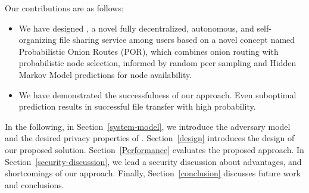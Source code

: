
Our contributions are as follows: 
\begin{itemize}
\item We have designed \name, a novel fully decentralized, autonomous,
and self-organizing file sharing service among users based on a novel
concept named Probabilistic Onion Routes (POR), which combines onion routing with
probabilistic node selection, informed by random peer sampling and
Hidden Markov Model predictions for node availability. 
\item  We have demonstrated the successfulness of our approach. Even
  suboptimal prediction results in successful file transfer with high
  probability. 
\end{itemize}

In the following, in Section~\ref{system-model}, we introduce the
adversary model and the desired privacy properties of \name. Section~\ref{design}
introduces the design of our proposed solution. Section~\ref{Performance}
evaluates the proposed approach. In Section~\ref{security-discussion}, we lead a security discussion
about advantages, and shortcomings of our approach.
Finally, Section~\ref{conclusion} discusses future work and conclusions.
